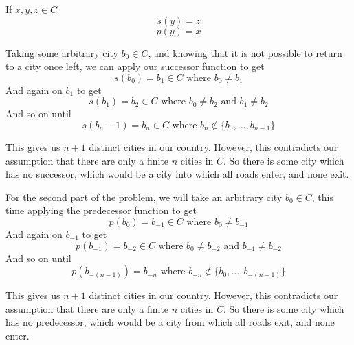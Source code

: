 \documentclass[12pt]{article}
\begin{document}
If $x,y,z \in C$
\[s(y) = z\]
\[p(y) = x\]

Taking some arbitrary city $b_0 \in C$, and knowing that it is not possible to return to a city once left, we can apply our successor function to get 
\[s(b_0) = b_1 \in C \text{ where } b_0 \ne b_1\]
And again on $b_1$ to get
\[s(b_1) = b_2 \in C \text{ where } b_0 \ne b_2 \text{ and } b_1 \ne b_2\]
And so on until
\[s(b_n-1) = b_n \in C \text{ where } b_n \notin \{b_0,\dots,b_{n-1}\}\]

This gives us $n+1$ distinct cities in our country. However, this contradicts our assumption that there are only a finite $n$ cities in $C$. So there is some city which has no successor, which would be a city into which all roads enter, and none exit. 

For the second part of the problem, we will take an arbitrary city $b_0 \in C$, this time applying the predecessor function to get
\[p(b_0) = b_{-1} \in C \text{ where } b_0 \ne b_{-1}\]
And again on $b_{-1}$ to get
\[p(b_{-1}) = b_{-2} \in C \text{ where } b_0 \ne b_{-2} \text{ and } b_{-1} \ne b_{-2}\]
And so on until
\[p(b_{-(n-1)}) = b_{-n} \text{ where } b_{-n} \notin \{b_0,\dots,b_{-(n-1)}\}\]

This gives us $n+1$ distinct cities in our country. However, this contradicts our assumption that there are only a finite $n$ cities in $C$. So there is some city which has no predecessor, which would be a city from which all roads exit, and none enter. 
\end{document}
